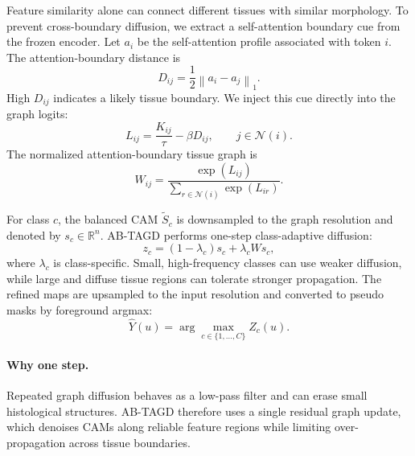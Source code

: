 Feature similarity alone can connect different tissues with similar morphology. To prevent cross-boundary diffusion, we extract a self-attention boundary cue from the frozen encoder. Let $a_i$ be the self-attention profile associated with token $i$. The attention-boundary distance is
\begin{equation}
    D_{ij}
    =
    \frac{1}{2}
    \left\|
        a_i - a_j
    \right\|_1 .
    \label{eq:attn_distance}
\end{equation}
High $D_{ij}$ indicates a likely tissue boundary. We inject this cue directly into the graph logits:
\begin{equation}
    L_{ij}
    =
    \frac{K_{ij}}{\tau}
    -
    \beta D_{ij},
    \qquad j \in \mathcal{N}(i).
    \label{eq:graph_logits}
\end{equation}
The normalized attention-boundary tissue graph is
\begin{equation}
    W_{ij}
    =
    \frac{\exp(L_{ij})}
    {\sum_{r \in \mathcal{N}(i)} \exp(L_{ir})}.
    \label{eq:graph_softmax}
\end{equation}

For class $c$, the balanced CAM $\widetilde{S}_c$ is downsampled to the graph resolution and denoted by $s_c \in \mathbb{R}^{n}$. AB-TAGD performs one-step class-adaptive diffusion:
\begin{equation}
    z_c
    =
    (1-\lambda_c)s_c
    +
    \lambda_c W s_c ,
    \label{eq:abtagd}
\end{equation}
where $\lambda_c$ is class-specific. Small, high-frequency classes can use weaker diffusion, while large and diffuse tissue regions can tolerate stronger propagation. The refined maps are upsampled to the input resolution and converted to pseudo masks by foreground argmax:
\begin{equation}
    \hat{Y}(u)
    =
    \arg\max_{c \in \{1,\ldots,C\}}
    Z_c(u).
    \label{eq:pseudo_mask}
\end{equation}

\paragraph{Why one step.}
Repeated graph diffusion behaves as a low-pass filter and can erase small histological structures. AB-TAGD therefore uses a single residual graph update, which denoises CAMs along reliable feature regions while limiting over-propagation across tissue boundaries.

